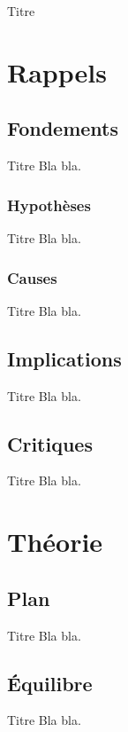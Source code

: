 \documentclass{beamer}
\begin{document}
\begin{frame}{Titre}
\tableofcontents
\end{frame}
\section{Rappels}
\subsection{Fondements}
\begin{frame}{Titre}
Bla bla.
\end{frame}
\subsubsection{Hypoth\`eses}
\begin{frame}{Titre}
Bla bla.
\end{frame}
\subsubsection{Causes}
\begin{frame}{Titre}
Bla bla.
\end{frame}
\subsection{Implications}
\begin{frame}{Titre}
Bla bla.
\end{frame}
\subsection{Critiques}
\begin{frame}{Titre}
Bla bla.
\end{frame}
\section{Th\'eorie}
\subsection{Plan}
\begin{frame}{Titre}
Bla bla.
\end{frame}
\subsection{\'Equilibre}
\begin{frame}{Titre}
Bla bla.
\end{frame}
\end{document}
